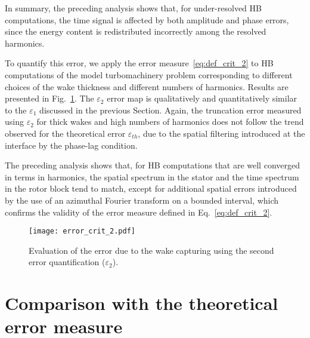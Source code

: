 In summary, the preceding analysis shows that, 
for under-resolved HB computations, the time 
signal is affected by both amplitude and phase errors, 
since the energy content is redistributed incorrectly 
among the resolved harmonics.

To quantify this error, we apply the error measure~\eqref{eq:def_crit_2}
to HB computations of the model turbomachinery 
problem corresponding to different choices 
of the wake thickness and different numbers of 
harmonics. Results are presented in Fig.~\ref{fig:crit_2_3d}.
The $\varepsilon_2$ error map is qualitatively 
and quantitatively similar to the $\varepsilon_1$ 
discussed in the previous Section. 
Again, the truncation error measured using $\varepsilon_2$ 
for thick wakes and high numbers of harmonics 
does not follow the trend observed for the 
theoretical error $\varepsilon_{th}$, 
due to the spatial filtering introduced at the 
interface by the phase-lag condition.

The preceding analysis shows that, for HB computations 
that are well converged in terms in harmonics, 
the spatial spectrum in the stator and the 
time spectrum in the rotor block tend to match, 
except for additional spatial errors introduced
by the use of an azimuthal Fourier transform on a 
bounded interval, which confirms the 
validity of the error measure defined in Eq.~\eqref{eq:def_crit_2}.
\begin{figure}[htp]
   \centering \texttt{[image: error\_crit\_2.pdf]}
  \caption{Evaluation of the error due to the wake 
  capturing using the second error quantification ($\varepsilon_2$).}
  \label{fig:crit_2_3d}
\end{figure}

\section{Comparison with the theoretical error measure}
\label{sub:comp_w_analytic}


